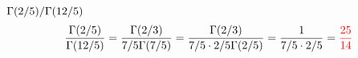 \item [4.] $\Gamma(2/5)/\Gamma(12/5)$
\[
\frac{\Gamma(2/5)}{\Gamma(12/5)}=\frac{\Gamma(2/3)}{7/5\Gamma(7/5)}=\frac{\Gamma(2/3)}{7/5\cdot2/5\Gamma(2/5)}=\frac{1}{7/5\cdot2/5}=\textcolor{red}{\frac{25}{14}}
\]